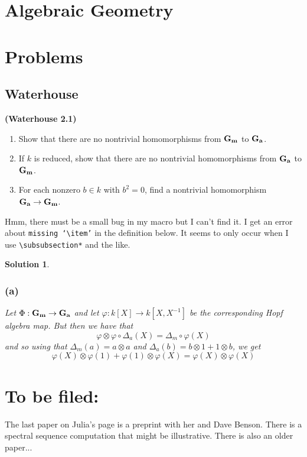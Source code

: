 \documentclass[12pt]{article}
\theoremstyle{nonumberbreak}
\newtheorem{sol}{Solution}
\theoremstyle{changebreak}
\theoremstyle{nonumberplain}
\theoremstyle{change}
\newenvironment{wprob}[1]{\begin{prob}{\normalfont\bfseries (Waterhouse #1) }\itshape}{\end{prob}}
\newcommand{\Ga}{\ensuremath\mathbf{G_a}}
\newcommand{\Gm}{\ensuremath\mathbf{G_m}}
\begin{document}

\newpage
\section{Algebraic Geometry}


\newpage
\section{Problems}

\subsection{Waterhouse}
\begin{wprob}{2.1}
	\begin{enumerate}
		\item Show that there are no nontrivial homomorphisms from $\Gm$ to $\Ga$.
		\item If $k$ is reduced, show that there are no nontrivial homomorphisms from $\Ga$ to $\Gm$.
		\item For each nonzero $b\in k$ with $b^2=0$, find a nontrivial homomorphism $\Ga\to\Gm$.
	\end{enumerate}
\end{wprob}
Hmm, there must be a small bug in my macro but I can't find it. I get an error about \texttt{missing `\textbackslash item'}
in the definition below. It seems to only occur when I use \texttt{\textbackslash subsubsection*} and the like.

\begin{sol}
	\subsubsection*{(a)}
	Let $\Phi:\Gm\to\Ga$ and let $\varphi:k[X]\to k[X,X^{-1}]$ be the corresponding Hopf
	algebra map. But then we have that 
	\[\varphi\otimes\varphi \circ \Delta_a(X)=\Delta_m\circ\varphi(X)\]
	and so using that $\Delta_m(a)=a\otimes a$ and $\Delta_a(b)=b\otimes1+1\otimes b$, we get
	\[\varphi(X)\otimes\varphi(1)+\varphi(1)\otimes\varphi(X)=\varphi(X)\otimes\varphi(X)\]
\end{sol}

\section{To be filed:}
The last paper on Julia's page is a preprint with her and Dave Benson. There is a spectral sequence computation that might be illustrative.
There is also an older paper...
\end{document}

